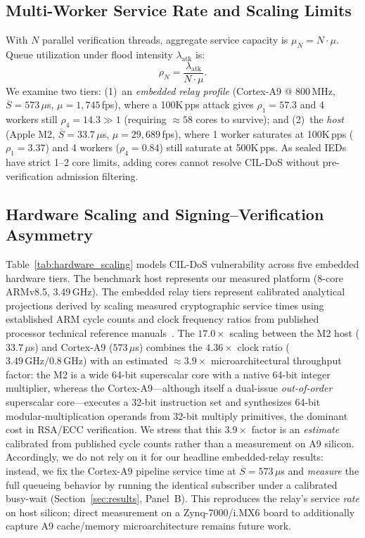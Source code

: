 \documentclass[journal]{IEEEtran}
\begin{document}
\subsection{Multi-Worker Service Rate and Scaling Limits}
With $N$ parallel verification threads, aggregate service capacity is $\mu_N = N \cdot \mu$. Queue utilization under flood intensity $\lambda_{\text{atk}}$ is:
\begin{equation}
\rho_N = \frac{\lambda_{\text{atk}}}{N \cdot \mu}.
\end{equation}
We examine two tiers: (1)~an \emph{embedded relay profile} (Cortex-A9 @ 800\,MHz, $\overline{S}=573\,\mu$s, $\mu=1{,}745$\,fps), where a 100K\,pps attack gives $\rho_1=57.3$ and 4 workers still $\rho_4=14.3\gg 1$ (requiring $\approx 58$ cores to survive); and (2)~the \emph{host} (Apple M2, $\overline{S}=33.7\,\mu$s, $\mu=29{,}689$\,fps), where 1 worker saturates at 100K\,pps ($\rho_1=3.37$) and 4 workers ($\rho_4=0.84$) still saturate at 500K\,pps. As sealed IEDs have strict 1--2 core limits, adding cores cannot resolve CIL-DoS without pre-verification admission filtering.

\subsection{Hardware Scaling and Signing--Verification Asymmetry}
Table~\ref{tab:hardware_scaling} models CIL-DoS vulnerability across five embedded hardware tiers. The benchmark host represents our measured platform (8-core ARMv8.5, 3.49\,GHz). The embedded relay tiers represent calibrated analytical projections derived by scaling measured cryptographic service times using established ARM cycle counts and clock frequency ratios from published processor technical reference manuals~\cite{arm2020cortex, arm_cortex_a9_trm, arm_cortex_r5, arm_cortex_m4}. The $17.0\times$ scaling between the M2 host ($33.7\,\mu$s) and Cortex-A9 ($573\,\mu$s) combines the $4.36\times$ clock ratio ($3.49\,\text{GHz}/0.8\,\text{GHz}$) with an estimated $\approx 3.9\times$ microarchitectural throughput factor: the M2 is a wide 64-bit superscalar core with a native 64-bit integer multiplier, whereas the Cortex-A9---although itself a dual-issue \emph{out-of-order} superscalar core---executes a 32-bit instruction set and synthesizes 64-bit modular-multiplication operands from 32-bit multiply primitives, the dominant cost in RSA/ECC verification. We stress that this $3.9\times$ factor is an \emph{estimate} calibrated from published cycle counts rather than a measurement on A9 silicon. Accordingly, we do not rely on it for our headline embedded-relay results: instead, we fix the Cortex-A9 pipeline service time at $\overline{S}=573\,\mu$s and \emph{measure} the full queueing behavior by running the identical subscriber under a calibrated busy-wait (Section~\ref{sec:results}, Panel~B). This reproduces the relay's service \emph{rate} on host silicon; direct measurement on a Zynq-7000/i.MX6 board to additionally capture A9 cache/memory microarchitecture remains future work.
\end{document}
